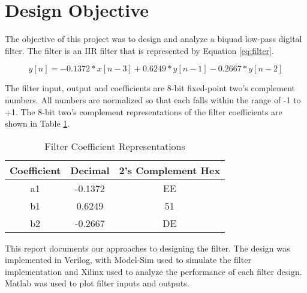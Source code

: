 \section*{Design Objective}
The objective of this project was to design and analyze a biquad low-pass digital filter. The filter is an IIR filter that is represented by Equation \ref{eq:filter}.

\begin{equation}
y[n] = -0.1372*x[n-3] + 0.6249*y[n-1] - 0.2667*y[n-2]
\end{equation}
\label{eq:filter}

The filter input, output and coefficients are 8-bit fixed-point two's complement numbers. All numbers are normalized so that each falls within the range of -1 to +1. The 8-bit two's complement representations of the filter coefficients are shown in Table \ref{tab:filtcoeff}.

\begin{table}[bh]
\centering
\begin{tabular}{c|c|c}
Coefficient & Decimal & 2's Complement Hex \\
\hline
a1 & -0.1372 & EE \\
\hline
b1 & 0.6249 & 51 \\
\hline
b2 & -0.2667 & DE \\
\end{tabular}  
\caption{Filter Coefficient Representations}
\label{tab:filtcoeff}
\end{table}

This report documents our approaches to designing the filter. The design was implemented in Verilog, with Model-Sim used to simulate the filter implementation and Xilinx used to analyze the performance of each filter design. Matlab was used to plot filter inputs and outputs.



